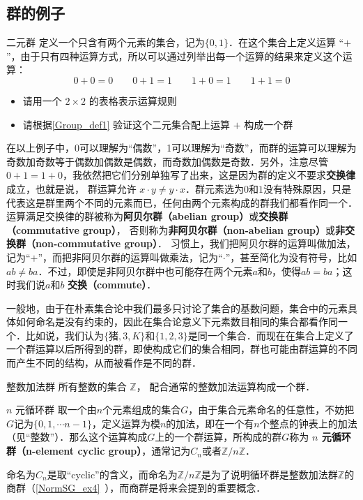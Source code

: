 \subsection{群的例子}

\begin{exercise}{二元群}\label{Group_exe1}
定义一个只含有两个元素的集合，记为$\{0, 1\}$．在这个集合上定义运算 “$+$”，由于只有四种运算方式，所以可以通过列举出每一个运算的结果来定义这个运算：
\begin{equation}\label{Group_eq1}
0+0=0 \qquad 0+1=1 \qquad 1+0=1 \qquad 1+1=0
\end{equation}
\begin{itemize}
\item 请用一个 $2\times2$ 的表格表示运算规则
\item 请根据\autoref{Group_def1} 验证这个二元集合配上运算 $+$ 构成一个群
\end{itemize}
\end{exercise}

在以上例子中，0可以理解为“偶数”，1可以理解为“奇数”，而群的运算可以理解为奇数加奇数等于偶数加偶数是偶数，而奇数加偶数是奇数．另外，注意尽管$0+1=1+0$，我依然把它们分别单独写了出来，这是因为群的定义不要求\textbf{交换律}成立，也就是说， 群运算允许 $x\cdot y\neq y\cdot x$．群元素选为$0$和$1$没有特殊原因，只是代表这是群里两个不同的元素而已，任何由两个元素构成的群我们都看作同一个． 运算满足交换律的群被称为\textbf{阿贝尔群（abelian group）}或\textbf{交换群（commutative group）}， 否则称为\textbf{非阿贝尔群（non-abelian group）}或\textbf{非交换群（non-commutative group）}． 习惯上，我们把阿贝尔群的运算叫做加法，记为“$+$”，而把非阿贝尔群的运算叫做乘法，记为“$\cdot$”，甚至简化为没有符号，比如$ab\not= ba$．不过，即使是非阿贝尔群中也可能存在两个元素$a$和$b$，使得$ab=ba$；这时我们说$a$和$b$ \textbf{交换（commute）}．

一般地，由于在朴素集合论中我们最多只讨论了集合的基数问题，集合中的元素具体如何命名是没有约束的，因此在集合论意义下元素数目相同的集合都看作同一个．比如说，我们认为$\{\text{猪},3, K\}$和$\{1,2,3\}
$是同一个集合．而现在在集合上定义了一个群运算以后所得到的群，即使构成它们的集合相同，群也可能由群运算的不同而产生不同的结构，从而被看作是不同的群．

\begin{example}{整数加法群}\label{Group_ex1}
所有整数的集合 $\mathbb Z$， 配合通常的整数加法运算构成一个群．
\end{example}

\begin{example}{$n$ 元循环群}\label{Group_ex2}
取一个由$n$个元素组成的集合$G$，由于集合元素命名的任意性，不妨把$G$记为$\{0, 1, \cdots n-1\}$，定义运算为模$n$的加法，即在一个有$n$个整点的钟表上的加法（见“整数”）．那么这个运算构成$G$上的一个群运算，所构成的群$G$称为 \textbf{$n$ 元\textbf{循环群（n-element cyclic group）}}，通常记为$C_n$或者$\mathbb{Z}/n\mathbb{Z}$．

命名为$C_n$是取“cyclic”的含义，而命名为$\mathbb{Z}/n\mathbb{Z}$是为了说明循环群是整数加法群$\mathbb{Z}$的商群（\autoref{NormSG_ex4}~），而商群是将来会提到的重要概念．
\end{example}

